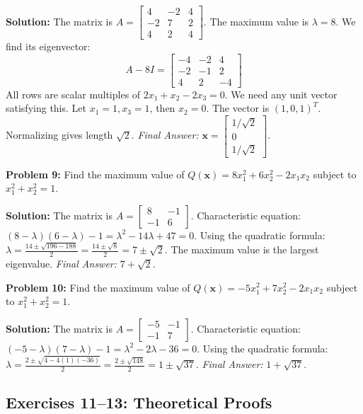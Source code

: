 \documentclass[11pt, letterpaper]{article}
\theoremstyle{definition}
\theoremstyle{remark}
\begin{document}
\textbf{Solution:}
The matrix is $A = \begin{bmatrix} 4 & -2 & 4 \\ -2 & 7 & 2 \\ 4 & 2 & 4 \end{bmatrix}$.
The maximum value is $\lambda = 8$. We find its eigenvector:
\[ A - 8I = \begin{bmatrix} -4 & -2 & 4 \\ -2 & -1 & 2 \\ 4 & 2 & -4 \end{bmatrix} \]
All rows are scalar multiples of $2x_1 + x_2 - 2x_3 = 0$. We need any unit vector satisfying this. Let $x_1 = 1, x_3 = 1$, then $x_2 = 0$. The vector is $(1, 0, 1)^T$. Normalizing gives length $\sqrt{2}$.
\textit{Final Answer:} $\mathbf{x} = \begin{bmatrix} 1/\sqrt{2} \\ 0 \\ 1/\sqrt{2} \end{bmatrix}$.

\vspace{1em}
\textbf{Problem 9:} Find the maximum value of $Q(\mathbf{x}) = 8x_1^2 + 6x_2^2 - 2x_1x_2$ subject to $x_1^2 + x_2^2 = 1$.

\textbf{Solution:}
The matrix is $A = \begin{bmatrix} 8 & -1 \\ -1 & 6 \end{bmatrix}$.
Characteristic equation: $(8-\lambda)(6-\lambda) - 1 = \lambda^2 - 14\lambda + 47 = 0$.
Using the quadratic formula: $\lambda = \frac{14 \pm \sqrt{196 - 188}}{2} = \frac{14 \pm \sqrt{8}}{2} = 7 \pm \sqrt{2}$.
The maximum value is the largest eigenvalue.
\textit{Final Answer:} $7 + \sqrt{2}$.

\vspace{1em}
\textbf{Problem 10:} Find the maximum value of $Q(\mathbf{x}) = -5x_1^2 + 7x_2^2 - 2x_1x_2$ subject to $x_1^2 + x_2^2 = 1$.

\textbf{Solution:}
The matrix is $A = \begin{bmatrix} -5 & -1 \\ -1 & 7 \end{bmatrix}$.
Characteristic equation: $(-5-\lambda)(7-\lambda) - 1 = \lambda^2 - 2\lambda - 36 = 0$.
Using the quadratic formula: $\lambda = \frac{2 \pm \sqrt{4 - 4(1)(-36)}}{2} = \frac{2 \pm \sqrt{148}}{2} = 1 \pm \sqrt{37}$.
\textit{Final Answer:} $1 + \sqrt{37}$.

\subsection{Exercises 11--13: Theoretical Proofs}
\end{document}
